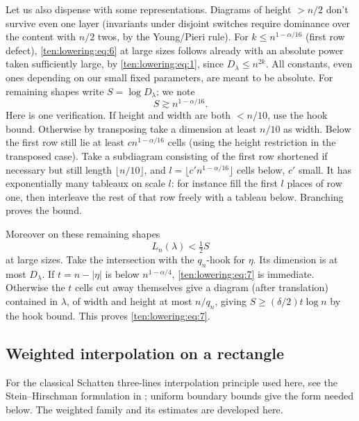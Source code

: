 Let us also dispense with some representations. Diagrams of height \(>n/2\) don't survive even one layer (invariants under disjoint switches require dominance over the content with \(n/2\) twos, by the Young/Pieri rule). For \(k\le n^{1-\alpha/16}\) (first row defect), \eqref{ten:lowering:eq:6} at large sizes follows already with an absolute power taken sufficiently large, by \eqref{ten:lowering:eq:1}, since \(D_\lambda\le n^{2k}\). All constants, even ones depending on our small fixed parameters, are meant to be absolute. For remaining shapes write \(S=\log D_\lambda\); we note
\[
                            S\gtrsim n^{1-\alpha/16}.
\]
Here is one verification. If height and width are both \(< n/10\), use the hook bound. Otherwise by transposing take a dimension at least \(n/10\) as width. Below the first row still lie at least \(c n^{1-\alpha/16}\) cells (using the height restriction in the transposed case). Take a subdiagram consisting of the first row shortened if necessary but still length \(\lfloor n/10\rfloor\), and \(l=\lfloor c' n^{1-\alpha/16}\rfloor\) cells below, \(c'\) small. It has exponentially many tableaux on scale \(l\): for instance fill the first \(l\) places of row one, then interleave the rest of that row freely with a tableau below. Branching proves the bound.

Moreover on these remaining shapes
\begin{equation}
                              L_n(\lambda)<\tfrac12 S                       \label{ten:lowering:eq:7}
\end{equation}
at large sizes. Take the intersection with the \(q_n\)-hook for \(\eta\). Its dimension is at most \(D_\lambda\). If \(t=n-|\eta|\) is below \(n^{1-\alpha/4}\), \eqref{ten:lowering:eq:7} is immediate. Otherwise the \(t\) cells cut away themselves give a diagram (after translation) contained in \(\lambda\), of width and height at most \(n/q_n\), giving \(S\ge (\delta/2)t\log n\) by the hook bound. This proves \eqref{ten:lowering:eq:7}.

\subsection{Weighted interpolation on a rectangle}
For the classical Schatten three-lines interpolation principle used here,
see the Stein--Hirschman formulation in
\cite[Section 3.1, Theorem 3.1]{SutterBertaTomamichel2017}; uniform boundary
bounds give the form needed below. The weighted family and its estimates
are developed here.

